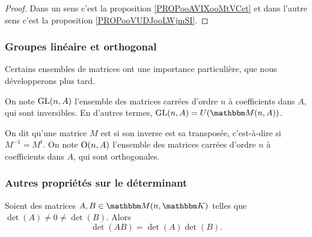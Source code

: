 \begin{proof}
    Dans un sens c'est la proposition \ref{PROPooAVIXooMtVCet} et dans l'autre sens c'est la proposition \ref{PROPooVUDJooLWjmSI}.
\end{proof}

\subsubsection{Groupes linéaire et orthogonal}

Certains ensembles de matrices ont une importance particulière, que nous développerons plus tard.

\begin{definition}
On note \( \textup{GL}(n,A) \) l'ensemble des matrices carrées d'ordre \( n \) à coefficients dans \( A \), qui sont inversibles. En d'autres termes, \( \GL(n,A) = U (\eM (n,A) ) \).
\end{definition}

\begin{definition}\label{DefMatriceOrthogonale}
    On dit qu'une matrice \( M \) est  si son inverse est sa transposée, c'est-à-dire si \( M^{-1} = M^t \). On note \( \operatorname{O}(n, A) \) l'ensemble des matrices carrées d'ordre \( n \) à coefficients dans \( A \), qui sont orthogonales.
\end{definition}

\subsubsection{Autres propriétés sur le déterminant}
\label{SUBSECooKMSVooBBHwkH}

\begin{proposition}    
    Soient des matrices \( A,B\in \eM(n,\eK)\) telles que \( \det(A)\neq 0\neq \det(B)\). Alors
    \begin{equation}
        \det(AB)=\det(A)\det(B).
    \end{equation}
\end{proposition}

